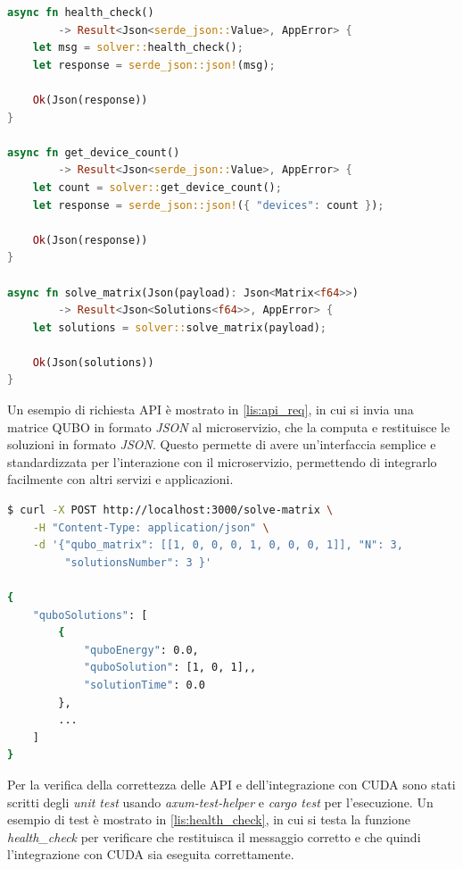 \vspace{5mm}
\begin{lstlisting}[language=Rust, caption=Web API, label=lis:api]
async fn health_check() 
        -> Result<Json<serde_json::Value>, AppError> {
    let msg = solver::health_check();
    let response = serde_json::json!(msg);

    Ok(Json(response))
}

async fn get_device_count() 
        -> Result<Json<serde_json::Value>, AppError> {
    let count = solver::get_device_count();
    let response = serde_json::json!({ "devices": count });

    Ok(Json(response))
}

async fn solve_matrix(Json(payload): Json<Matrix<f64>>) 
        -> Result<Json<Solutions<f64>>, AppError> {
    let solutions = solver::solve_matrix(payload);

    Ok(Json(solutions))
}
\end{lstlisting}
\vspace{5mm}


Un esempio di richiesta API è mostrato in \ref{lis:api_req}, in cui si invia una matrice QUBO in formato \textit{JSON} al microservizio, che la computa e restituisce le soluzioni in formato \textit{JSON}. Questo permette di avere un'interfaccia semplice e standardizzata per l'interazione con il microservizio, permettendo di integrarlo facilmente con altri servizi e applicazioni.

\newpage
\vspace{5mm}
\begin{lstlisting}[language=bash, caption=Esempio richiesta API, label=lis:api_req]
$ curl -X POST http://localhost:3000/solve-matrix \
    -H "Content-Type: application/json" \
    -d '{"qubo_matrix": [[1, 0, 0, 0, 1, 0, 0, 0, 1]], "N": 3, 
         "solutionsNumber": 3 }'

{
    "quboSolutions": [
        {
            "quboEnergy": 0.0,
            "quboSolution": [1, 0, 1],,
            "solutionTime": 0.0
        },
        ...
    ]
}
\end{lstlisting}
\vspace{5mm}

Per la verifica della correttezza delle API e dell'integrazione con CUDA sono stati scritti degli \textit{unit test} usando \textit{axum-test-helper} e \textit{cargo test} per l'esecuzione. Un esempio di test è mostrato in \ref{lis:health_check}, in cui si testa la funzione \textit{health\_check} per verificare che restituisca il messaggio corretto e che quindi l'integrazione con CUDA sia eseguita correttamente.

